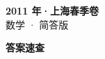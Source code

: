\documentclass[zihao=-4, a4paper]{ctexart}
\begin{document}
\begin{center}
  {\Large\bfseries 2011 年·上海春季卷}\\[4pt]
  {\large 数学 · 简答版}
\end{center}
\medskip
{}

\clearpage
{}
\begin{center}{\Large\bfseries 答案速查}\end{center}
\medskip

\end{document}
